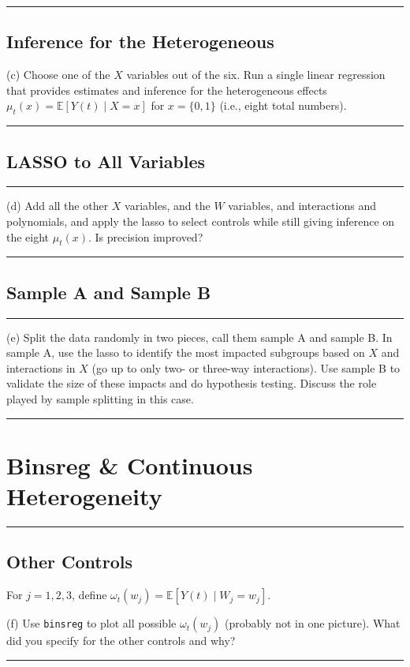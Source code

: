 \documentclass{article}
\newenvironment{colorparagraph}[1]{\par\color{#1}}{\par}
\begin{document}
\begin{colorparagraph}{questioncolor}
\label{q3c}
\rule{\textwidth}{0.5pt}
\subsection{Inference for the Heterogeneous}
(c) Choose one of the \( X \) variables out of the six. Run a single linear regression that provides estimates and inference for the heterogeneous effects \( \mu_t(x) = \mathbb{E}[Y(t) \mid X = x] \) for \( x = \{0, 1\} \) (i.e., eight total numbers).

\rule{\textwidth}{0.5pt}
\end{colorparagraph}

\begin{colorparagraph}{questioncolor}
\label{q3d}
\subsection{LASSO to All Variables}
\rule{\textwidth}{0.5pt}
(d) Add all the other \( X \) variables, and the \( W \) variables, and interactions and polynomials, and apply the lasso to select controls while still giving inference on the eight \( \mu_t(x) \). Is precision improved?

\rule{\textwidth}{0.5pt}
\end{colorparagraph}

\begin{colorparagraph}{questioncolor}
\subsection{Sample A and Sample B}
\label{q3e}
\rule{\textwidth}{0.5pt}
(e) Split the data randomly in two pieces, call them sample A and sample B. In sample A, use the lasso to identify the most impacted subgroups based on \( X \) and interactions in \( X \) (go up to only two- or three-way interactions). Use sample B to validate the size of these impacts and do hypothesis testing. Discuss the role played by sample splitting in this case.

\rule{\textwidth}{0.5pt}
\end{colorparagraph}

\begin{colorparagraph}{questioncolor}

\section*{Binsreg \& Continuous Heterogeneity}
\label{q3f}
\rule{\textwidth}{0.5pt}
\subsection{Other Controls}
For \( j = 1, 2, 3 \), define \( \omega_t(w_j) = \mathbb{E}[Y(t) \mid W_j = w_j] \).

(f) Use \texttt{binsreg} to plot all possible \( \omega_t(w_j) \) (probably not in one picture). What did you specify for the other controls and why?

\rule{\textwidth}{0.5pt}
\end{colorparagraph}
\end{document}
